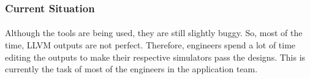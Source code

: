 \subsubsection{Current Situation}
\paragraph{}
Although the tools are being used, they are still slightly buggy. So, most of the time, LLVM outputs are not perfect. Therefore, engineers spend a lot of time editing the outputs to make their respective simulators pass the designs. This is currently the task of most of the engineers in the application team.